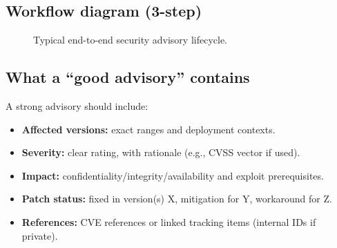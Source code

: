 \documentclass[11pt]{article}
\begin{document}
\subsection{Workflow diagram (3-step)}
\begin{figure}[!htbp]
\centering
{}
\caption{Typical end-to-end security advisory lifecycle.}
\end{figure}

\subsection{What a ``good advisory'' contains}
A strong advisory should include:

\begin{itemize}[leftmargin=*,itemsep=2pt]
  \item \textbf{Affected versions:} exact ranges and deployment contexts.
  \item \textbf{Severity:} clear rating, with rationale (e.g., CVSS vector if used).
  \item \textbf{Impact:} confidentiality/integrity/availability and exploit prerequisites.
  \item \textbf{Patch status:} fixed in version(s) X, mitigation for Y, workaround for Z.
  \item \textbf{References:} CVE references or linked tracking items (internal IDs if private).
\end{itemize}
\end{document}
